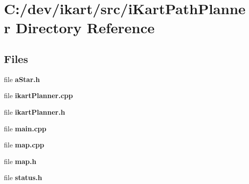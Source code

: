 \section{C\+:/dev/ikart/src/i\+Kart\+Path\+Planner Directory Reference}
\label{dir_7335d887aad74a65ded84584de18e44d}
\subsection*{Files}
\begin{DoxyCompactItemize}
\item 
file {\bfseries a\+Star.\+h}
\item 
file {\bfseries ikart\+Planner.\+cpp}
\item 
file {\bfseries ikart\+Planner.\+h}
\item 
file {\bfseries main.\+cpp}
\item 
file {\bfseries map.\+cpp}
\item 
file {\bfseries map.\+h}
\item 
file {\bfseries status.\+h}
\end{DoxyCompactItemize}
